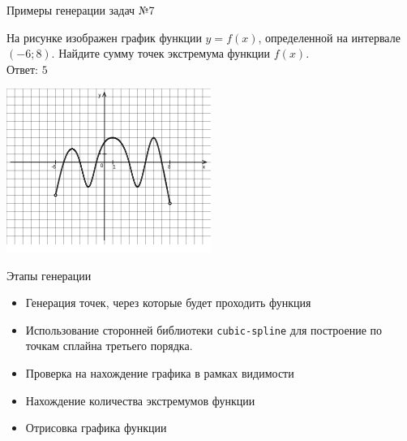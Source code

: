 \documentclass[aspectratio=169]{beamer}
\begin{document}
\begin{frame}{Примеры генерации задач №7}
    \begin{multicols}{2}
        На рисунке изображен график функции $y=f(x)$, определенной на интервале $(-6;8)$. Найдите сумму точек экстремума функции $f(x)$.\\

        Ответ: $5$

        \includegraphics[width=0.5\textwidth]{images/020693809529216n0}
    \end{multicols}
\end{frame}

\begin{frame}{Этапы генерации}
    \begin{itemize}
        \item Генерация точек, через которые будет проходить функция
        \item Использование сторонней библиотеки \texttt{cubic-spline} для построение по точкам сплайна третьего порядка.
        \item Проверка на нахождение графика в рамках видимости %
        \item Нахождение количества экстремумов функции
        \item Отрисовка графика функции
    \end{itemize}
    
\end{frame}

\end{document}
